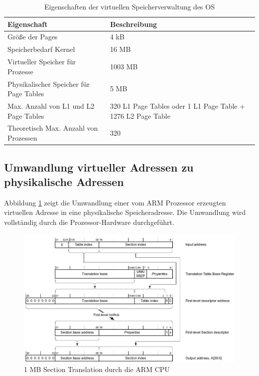 \begin{table}[H]
\begin{tabular}{p{7cm} | p{7cm}}
  \textbf{Eigenschaft} & \textbf{Beschreibung} \\ \hline
  Größe der Pages & 4 kB\\
  Speicherbedarf Kernel & 16 MB\\
  Virtueller Speicher für Prozesse & 1003 MB\\
  Physikalischer Speicher für Page Tables	& 5 MB\\
  Max. Anzahl von L1 und L2 Page Tables & 320 L1 Page Tables oder 1 L1 Page Table + 1276 L2 Page  Table\\
  Theoretisch Max. Anzahl von Prozessen & 320\\
 \end{tabular}
 \caption{Eigenschaften der virtuellen Speicherverwaltung des OS}
 \label{table:SpecifiedVirtualMemory}
\end{table}




\subsection{Umwandlung virtueller Adressen zu physikalische Adressen}

Abbildung \ref{fig:largePageTranslation} zeigt die Umwandlung einer vom ARM Prozessor erzeugten virtuellen Adresse in eine physikalische Speicheradresse. Die Umwandlung wird vollständig durch die Prozessor-Hardware durchgeführt.


\begin{figure}[H]
	\includegraphics[scale=0.8]{figures/sectionTranslation}
	\caption{1 MB Section Translation durch die ARM CPU \cite[S. B3-1335]{ARM:ARM}}
	\label{fig:largePageTranslation}
\end{figure}

